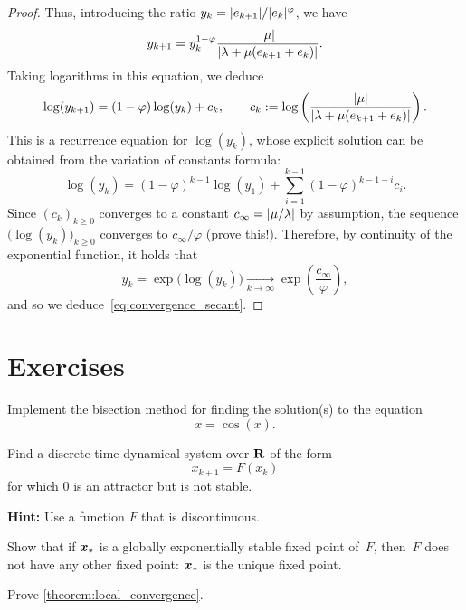 \begin{proof}
    Thus, introducing the ratio $y_k = \lvert e_{k+1}\rvert/\lvert e_k\rvert^{\varphi}$,
    we have
    \[
        y_{k+1} = y_k^{1 - \varphi} \frac{\lvert\mu\rvert}{\lvert\lambda + \mu (e_{k+1} + e_k)\rvert}.
    \]
    Taking logarithms in this equation,
    we deduce
    \[
        \log(y_{k+1}) = (1 - \varphi) \log(y_k) + c_k,
        \qquad c_k := \log \left( \frac{\lvert\mu\rvert}{\lvert\lambda + \mu (e_{k+1} + e_k)\rvert} \right).
    \]
    This is a recurrence equation for $\log(y_k)$,
    whose explicit solution can be obtained from the variation of constants formula:
    \[
        \log(y_k) = (1 - \varphi)^{k-1} \log(y_1) + \sum_{i=1}^{k-1} (1 - \varphi)^{k-1-i} c_i.
    \]
    Since $(c_k)_{k \geq 0}$ converges to a constant $c_{\infty} = \lvert\mu/\lambda\rvert$ by assumption,
    the sequence $\bigl(\log(y_k)\bigr)_{k\geq 0}$ converges to $c_{\infty} / \varphi$ (prove this!).
    Therefore, by continuity of the exponential function,
    it holds that
    \[
        y_k =  \exp \bigl(  \log(y_k) \bigr) \xrightarrow[k \to \infty]{} \exp \left( \frac{c_{\infty}}{\varphi} \right),
    \]
    and so we deduce~\eqref{eq:convergence_secant}.
\end{proof}

\section{Exercises}

\begin{compexercise}
Implement the bisection method for finding the solution(s) to the equation
\[
    x = \cos(x).
\]
\end{compexercise}

\begin{exercise}
    Find a discrete-time dynamical system over $\mathbf R$ of the form
    \[
        x_{k+1} = F(x_{k})
    \]
    for which $0$ is an attractor but is not stable.

    \noindent \textbf{Hint:} Use a function $F$ that is discontinuous.
\end{exercise}

\begin{exercise}
    \label{exercise:global_exponential_stability}
    Show that if $\mathbf{\boldsymbol{x}}_*$ is a globally exponentially stable fixed point of~$F$,
    then~$F$ does not have any other fixed point: $\mathbf{\boldsymbol{x}}_*$ is the unique fixed point.
\end{exercise}

\begin{exercise}
    \label{exercise:prove_local_convergence}
    Prove \cref{theorem:local_convergence}.
\end{exercise}

